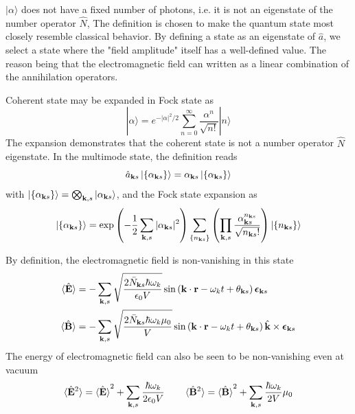 \documentclass[../../../main.tex]{subfiles}
\begin{document}
$|\alpha\rangle$ does not have a fixed number of photons, i.e. it is not an eigenstate of the number operator $\hat{N}$,
The definition is chosen to make the quantum state most closely resemble classical behavior.
By defining a state as an eigenstate of $\hat{a}$, we select a state where the "field amplitude" itself has a well-defined value.
The reason being that the electromagnetic field can written as a linear combination of the annihilation operators.

Coherent state may be expanded in Fock state as
\begin{equation*}
  |\alpha\rangle = e^{-|\alpha|^2/2} \sum_{n=0}^{\infty} \frac{\alpha^n}{\sqrt{n!}} |n\rangle
\end{equation*}
The expansion demonstrates that the coherent state is not a number operator $\hat{N}$ eigenstate.
In the multimode state, the definition reads
\begin{equation*}
  \hat{a}_{\mathbf{k }s} \ket{\left\{ \alpha_{\mathbf{k }s} \right\} }=\alpha_{\mathbf{k }s} \ket{\left\{ \alpha_{\mathbf{k }s} \right\} }
\end{equation*}
with $  \ket{\left\{ \alpha_{\mathbf{k }s} \right\} } = \bigotimes_{\mathbf{k},s} \ket{\alpha_{\mathbf{k }s}}$, and the Fock state expansion as
\begin{equation*}
  | \{ \alpha_{\mathbf{k }s} \} \rangle
  =
  \exp\left(-\frac{1}{2} \sum_{\mathbf{k},s} |\alpha_{\mathbf{k }s}|^2\right) \sum_{\{ n_{\mathbf{k }s} \}} \left( \prod_{\mathbf{k},s} \frac{\alpha_{\mathbf{k }s}^{n_{\mathbf{k }s}}}{\sqrt{n_{\mathbf{k }s}!}} \right) \ket{\{ n_{\mathbf{k }s} \}}
\end{equation*}

By definition, the electromagnetic field is non-vanishing in this state
\begin{align*}
  \braket{  \hat{\mathbf{E}}  }
   & =   - \sum_{\mathbf{k},s} \sqrt{\frac{2\bar{N}_{\mathbf{k}s}\hbar \omega_k }{ \epsilon_0 V}}  \sin   \left( \mathbf{k} \cdot \mathbf{r} - \omega_k t+\theta_{\mathbf{k}s}  \right) \boldsymbol{\epsilon}_{\mathbf{k}s}                  \\
  \braket{  \hat{\mathbf{B}}}
   & =   - \sum_{\mathbf{k},s} \sqrt{\frac{2 \bar{N}_{\mathbf{k}s}\hbar \omega_k \mu_0}{V}}  \sin   \left( \mathbf{k} \cdot \mathbf{r} - \omega_k t+\theta_{\mathbf{k}s}  \right) \hat{\mathbf{k}}\times \boldsymbol{\epsilon}_{\mathbf{k}s}
\end{align*}
The energy of electromagnetic field can also be seen to be non-vanishing even at vacuum
\begin{equation*}
  \braket{  \hat{\mathbf{E}}^2 }
  = \braket{\hat{\mathbf{E}} }^2+\sum_{\mathbf{k },s}\frac{\hbar \omega_k }{2\epsilon_0 V}\qquad
  \braket{  \hat{\mathbf{B}}^2 }
  = \braket{\hat{\mathbf{B}} }^2+\sum_{\mathbf{k },s}\frac{\hbar \omega_k}{2 V} \mu_0
\end{equation*}
\end{document}
